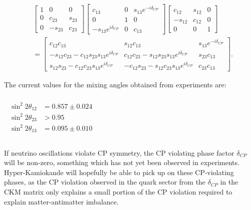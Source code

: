 \documentclass[11pt,oneside,a4paper]{article}
\begin{document}
\begin{equation}
\label{eq:para}
{\begin{aligned}&{\begin{bmatrix}1&0&0\\0&c_{23}&s_{23}\\0&-s_{23}&c_{23}\end{bmatrix}}{\begin{bmatrix}c_{13}&0&s_{13}e^{-i\delta _{CP}}\\0&1&0\\-s_{13}e^{i\delta _{CP}}&0&c_{13}\end{bmatrix}}{\begin{bmatrix}c_{12}&s_{12}&0\\-s_{12}&c_{12}&0\\0&0&1\end{bmatrix}}\\&={\begin{bmatrix}c_{12}c_{13}&s_{12}c_{13}&s_{13}e^{-i\delta _{CP}}\\-s_{12}c_{23}-c_{12}s_{23}s_{13}e^{i\delta _{CP}}&c_{12}c_{23}-s_{12}s_{23}s_{13}e^{i\delta _{CP}}&s_{23}c_{13}\\s_{12}s_{23}-c_{12}c_{23}s_{13}e^{i\delta _{CP}}&-c_{12}s_{23}-s_{12}c_{23}s_{13}e^{i\delta _{CP}}&c_{23}c_{13}\end{bmatrix}}.\end{aligned}}
\end{equation}

The current values for the mixing angles obtained from experiments are:
\paragraph{}
$
\begin{matrix}
{\begin{aligned}\sin ^{2}2\theta _{12}&=0.857\pm 0.024\\\sin ^{2}2\theta _{23}&>0.95\\\sin ^{2}2\theta _{13}&=0.095\pm 0.010\\\end{aligned}}
\end{matrix}
$

\paragraph{}
If neutrino oscillations violate CP symmetry, the CP violating phase factor $\delta_{CP}$ will be non-zero, something which has not yet been observed in experiments. Hyper-Kamiokande will hopefully be able to pick up on these CP-violating phases, as the CP violation observed in the quark sector from the $\delta_{CP}$ in the CKM matrix only explains a small portion of the CP violation required to explain matter-antimatter imbalance.
\end{document}
